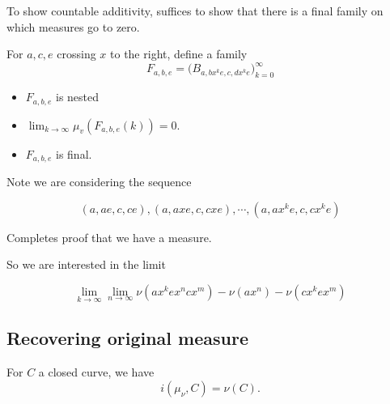 To show countable additivity, suffices to show that there is a final
family on which measures go to zero.

For $a,c,e$ crossing $x$ to the right, define a family
\[
  F_{a,b,e} = \bigl(B_{a,bx^ke,c,dx^k e}\bigr)_{k=0}^\infty
\]
\begin{itemize}
\item $F_{a,b,e}$ is nested
\item $\lim_{k \to \infty} \mu_v(F_{a,b,e}(k)) = 0$.
\item $F_{a,b,e}$ is final.
\end{itemize}

Note we are considering the sequence


\[
(a,ae,c,ce),(a,axe,c,cxe),\cdots,(a,ax^ke,c,cx^ke)
\]


\begin{figure}
\end{figure}

Completes proof that we have a measure.

So we are interested in the limit

\[
\lim_{k \to \infty} \lim_{n \to \infty} \nu(ax^kex^ncx^m)-\nu(ax^n)-\nu(cx^kex^m)
\]


\subsection{Recovering original measure}
\label{sec:recovery}

\begin{proposition}
For $C$ a closed curve, we have
\[
i(\mu_{\nu},C)=\nu(C).
\]
\end{proposition}

